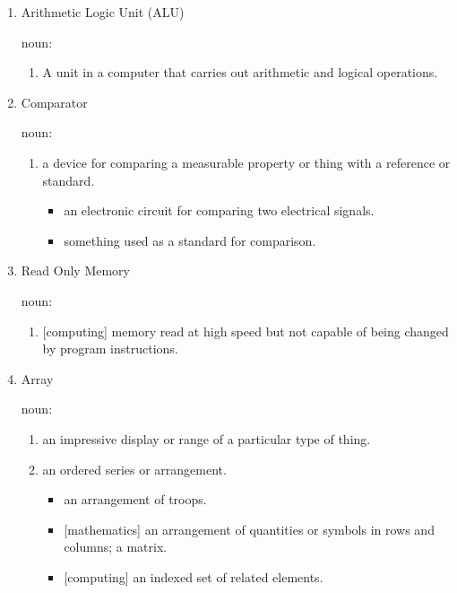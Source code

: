 \documentclass[12pt]{article}
\numberwithin{figure}{subsection}
\numberwithin{table}{subsection}
\numberwithin{equation}{subsection}
\begin{document}
\begin{enumerate}
  \item Arithmetic Logic Unit (ALU)

  noun:

  \begin{enumerate}
    \item A unit in a computer that carries out arithmetic and logical operations.
  \end{enumerate}

  \item Comparator

  noun:

  \begin{enumerate}
    \item a device for comparing a measurable property or thing with a reference or standard.

    \begin{itemize}
      \item an electronic circuit for comparing two electrical signals.
      \item something used as a standard for comparison.
    \end{itemize}
  \end{enumerate}

  \item{Read Only Memory}

  noun:

  \begin{enumerate}
    \item {[computing]} memory read at high speed but not capable of being changed by program instructions.
  \end{enumerate}

  \item{Array}

  noun:

  \begin{enumerate}
    \item an impressive display or range of a particular type of thing.

    \item an ordered series or arrangement.
      \begin{itemize}
        \item an arrangement of troops.
        \item {[mathematics]} an arrangement of quantities or symbols in rows and columns; a matrix.
        \item {[computing]} an indexed set of related elements.
      \end{itemize}


\end{enumerate}
\end{enumerate}
\end{document}
